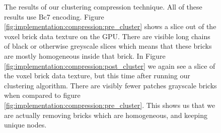 \begin{figure}[H]
    \centering
    \hfill
    \caption{The results of our clustering compression technique. All of these results use Bc7 encoding. Figure \ref{fig:implementation:compression:pre_cluster} shows a slice out of the voxel brick data texture on the GPU. There are visible long chains of black or otherwise greyscale slices which means that these bricks are mostly homogeneous inside that brick. In Figure \ref{fig:implementation:compression:post_cluster} we again see a slice of the voxel brick data texture, but this time after running our clustering algorithm. There are visibly fewer patches grayscale bricks when compared to figure \ref{fig:implementation:compression:pre_cluster}. This shows us that we are actually removing bricks which are homogeneous, and keeping unique nodes.} \label{fig:implementation:compression:cluster}
\end{figure}